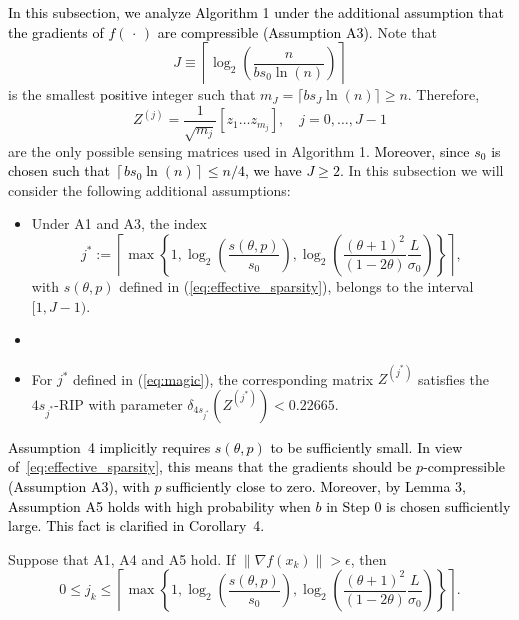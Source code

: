 \textcolor{black}{In this subsection, we analyze Algorithm 1 under the additional assumption that the gradients of \( f(\,\cdot\,) \) are compressible (Assumption A3).} Note that $$J\equiv\left\lceil\log_{2}\left(\frac{n}{b s_{0}\ln(n)}\right)\right\rceil$$ 
is the smallest \textcolor{black}{positive} integer such that $m_{J}=\lceil b s_{J}\ln(n)\rceil\geq n$. Therefore,
\begin{equation*}
    Z^{(j)}=\dfrac{1}{\sqrt{m_{j}}}\left[z_{1}\ldots z_{m_{j}}\right],\quad j=0,\ldots,J-1
\end{equation*}
are the only possible sensing matrices used in Algorithm 1. \textcolor{black}{Moreover, since $s_{0}$ is chosen such that $\left\lceil bs_{0}\ln(n)\right\rceil\leq n/4$, we have $J\geq 2$.} In this subsection we will consider the following additional assumptions:
\begin{itemize}
\item[\textbf{A4.}] Under A1 and A3, the index
\begin{equation}
    j^{*}:=\left\lceil \max\left\{1,\log_{2}\left(\dfrac{s(\theta,p)}{s_{0}}\right),\log_{2}\left(\dfrac{(\theta+1)^{2}}{(1-2\theta)}\dfrac{L}{\sigma_{0}}\right)\right\} \right\rceil,
\label{eq:magic}
\end{equation}
with $s(\theta,p)$ defined in (\ref{eq:effective_sparsity}), belongs to the interval $[1,J-1)$.
\item[]
\item[\textbf{A5.}] For $j^{*}$ defined in (\ref{eq:magic}), the corresponding matrix $Z^{(j^{*})}$ satisfies the $4s_{j^{*}}$-RIP with parameter $\delta_{4s_{j^{*}}}(Z^{(j^{*})})<0.22665$.
\end{itemize}

\begin{remark}
\textcolor{black}{Assumption~4 implicitly requires \( s(\theta, p) \) to be sufficiently small. In view of~\eqref{eq:effective_sparsity}, this means that the gradients should be \( p \)-compressible (Assumption A3), with \( p \) sufficiently close to zero. Moreover, by Lemma 3, Assumption A5 holds with high probability when \( b \) in Step 0 is chosen sufficiently large. This fact is clarified in Corollary~4.
}
\end{remark}

\begin{lemma}
\label{lem:mais1}
Suppose that A1, A4 and A5 hold. If $\|\nabla f(x_{k})\|>\epsilon$, then
\begin{equation}
0\leq j_{k}\leq \left\lceil \max\left\{1,\log_{2}\left(\dfrac{s(\theta,p)}{s_{0}}\right),\log_{2}\left(\dfrac{(\theta+1)^{2}}{(1-2\theta)}\dfrac{L}{\sigma_{0}}\right)\right\} \right\rceil.
\label{eq:mais1}
\end{equation}
\end{lemma}

